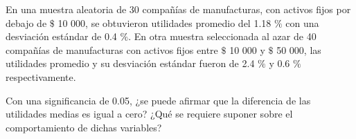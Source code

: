 \documentclass{../oxmathproblems}
\begin{document}
\begin{questions}
\miquestion  En una muestra aleatoria de 30 compañías de manufacturas, con activos fijos por debajo de $\$$ 10 000, se obtuvieron utilidades promedio del 1.18 $\%$ con una desviación estándar de 0.4 $\%$. 
En otra muestra seleccionada al azar de 40 compañías de manufacturas con activos fijos entre $\$$ 10 000 y $\$$ 50 000, las utilidades promedio y su desviación estándar fueron de 2.4 $\%$ y 0.6 $\%$ respectivamente. 

Con una significancia de 0.05, ¿se puede afirmar que la diferencia de las utilidades medias es igual a cero? ¿Qué se requiere suponer sobre el comportamiento de dichas variables?


\end{questions}
\end{document}

